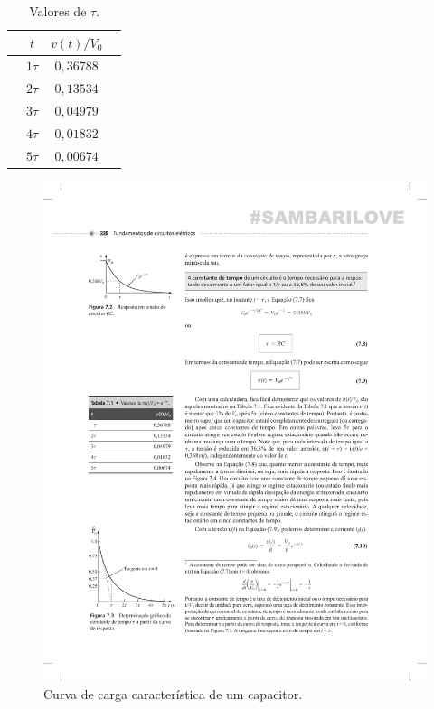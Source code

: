 \begin{table}
\begin{center}
\caption{Valores de $\tau$.}
\label{tb:capacitor}
\begin{tabular}{@{}cccc@{}}
\toprule
 & \textbf{$t$}  &\textbf{ $v(t)/V_0$} & \\ \midrule
 & $1\tau$ & $0,36788$ & \\
 & $2\tau$ & $0,13534$ & \\
 & $3\tau$ & $0,04979$ & \\
 & $4\tau$ & $0,01832$ & \\
 & $5\tau$ & $0,00674$ & \\ \bottomrule
\end{tabular}
\end{center}  
\end{table}

\begin{figure}[h!]
  \caption{Curva de carga característica de um capacitor.}
  \begin{center}
      \includegraphics[scale=1]{img/capacitor.pdf}
  \end{center}
  \label{fig:capacitor}
\end{figure}

